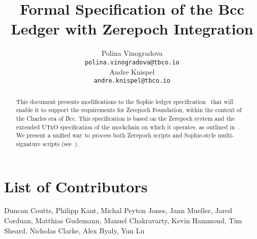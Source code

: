 

\cleardoublepage
\renewcommand{\thepage}{\arabic{page}}
\setcounter{page}{1}

\title{Formal Specification of the Bcc Ledger with Zerepoch
Integration}

\author{
   Polina Vinogradova \\ {\small \texttt{polina.vinogradova@tbco.io}} \\
   Andre Knispel \\ {\small \texttt{andre.knispel@tbco.io}} \\
   }

\date{}

\maketitle

\begin{abstract}
This document presents modifications to the Sophie ledger
specification~\cite{sophie_spec} that will enable it to support the requirements for Zerepoch Foundation, within the context of the Charles era
of Bcc. This specification is based on the Zerepoch system and the extended
UTxO specification of the mockchain on which it operates, as outlined in~\cite{chakravarty2020extended}.
%
We present a unified way to process both Zerepoch scripts and Sophie-style multi-signature scripts
(see~\cite{multi_sig}).
\end{abstract}

\section*{List of Contributors}
\label{acknowledgements}

Duncan Coutts,
Philipp Kant,
Michal Peyton Jones,
Jann Mueller,
Jared Corduan,
Matthias Gudemann,
Manuel Chakravarty,
Kevin Hammond,
Tim Sheard,
Nicholas Clarke,
Alex Byaly,
Yun Lu
